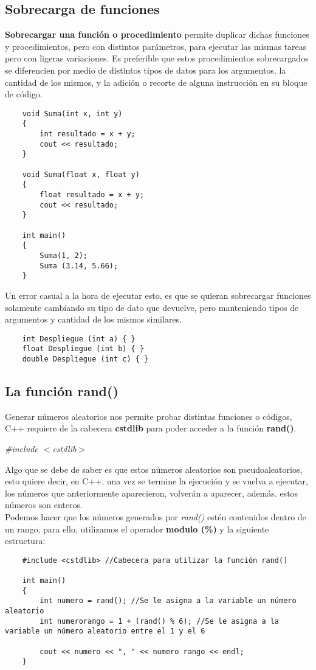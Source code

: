 \subsection{Sobrecarga de funciones}
\textbf{Sobrecargar una función o procedimiento} permite duplicar dichas funciones y procedimientos, pero con distintos parámetros, para ejecutar las mismas tareas pero con ligeras variaciones. Es preferible que estos procedimientos sobrecargados se diferencien por medio de distintos tipos de datos para los argumentos, la cantidad de los mismos, y la adición o recorte de alguna instrucción en su bloque de código.
\begin{lstlisting}
    void Suma(int x, int y)
    {
        int resultado = x + y;
        cout << resultado;
    }
    
    void Suma(float x, float y)
    {
        float resultado = x + y;
        cout << resultado;
    }

    int main()
    {
        Suma(1, 2);
        Suma (3.14, 5.66);
    }
\end{lstlisting}
Un error casual a la hora de ejecutar esto, es que se quieran sobrecargar funciones solamente cambiando su tipo de dato que devuelve, pero manteniendo tipos de argumentos y cantidad de los mismos similares.
\begin{lstlisting}
    int Despliegue (int a) { }
    float Despliegue (int b) { }
    double Despliegue (int c) { }
\end{lstlisting}

\subsection{La función rand()}
Generar números aleatorios nos permite probar distintas funciones o códigos, C++ requiere de la cabecera \textbf{cstdlib} para poder acceder a la función \textbf{rand()}.\begin{center}\textit{\#include $<$cstdlib$>$}\end{center}
Algo que se debe de saber es que estos números aleatorios son pseudoaleatorios, esto quiere decir, en C++, una vez se termine la ejecución y se vuelva a ejecutar, los números que anteriormente aparecieron, volverán a aparecer, además. estos números son enteros.\\
Podemos hacer que los números generados por \textit{rand()} estén contenidos dentro de un rango, para ello, utilizamos el operador \textbf{modulo (\%)} y la siguiente estructura:
\begin{lstlisting}
    #include <cstdlib> //Cabecera para utilizar la función rand()
    
    int main()
    {
        int numero = rand(); //Se le asigna a la variable un número aleatorio
        int numerorango = 1 + (rand() % 6); //Se le asigna a la variable un número aleatorio entre el 1 y el 6
        
        cout << numero << ", " << numero rango << endl;
    }
\end{lstlisting}

